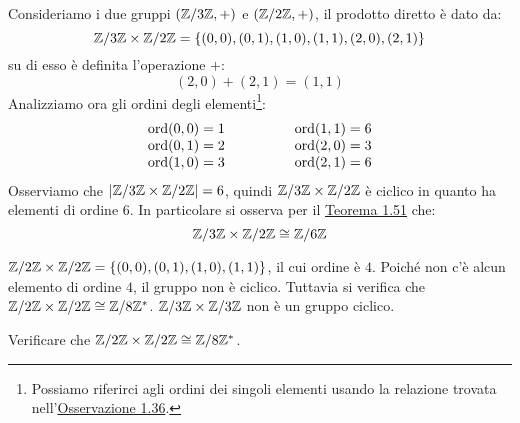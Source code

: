 \documentclass[11pt]{scrartcl}
\begin{document}
\begin{example}
Consideriamo i due gruppi $(\mathbb Z/3\mathbb Z, +)$ e $(\mathbb Z/2\mathbb Z, +)$, il prodotto diretto è dato da:
	\[ \mathbb Z/3\mathbb Z \times \mathbb Z/2\mathbb Z = \left\{(0,0), (0,1), (1,0), (1,1), (2,0), (2,1)\right\}
	\]
su di esso è definita l'operazione $+$:
	\[ (2,0) + (2,1)
	=
	(1, 1)
	\]
Analizziamo ora gli ordini degli elementi\footnote{Possiamo riferirci agli ordini dei singoli elementi usando la relazione trovata nell'\hyperref[g:OrdiniZn]{Osservazione 1.36}.}:
	\[
		\begin{array}{ccc}
		\operatorname{ord}(0,0)=1 \\
		\operatorname{ord}(0,1)=2 \\
		\operatorname{ord}(1,0)=3 \\		
		\end{array}
		\qquad
		\qquad
		\begin{array}{ccc}
		\operatorname{ord}(1,1)=6 \\
		\operatorname{ord}(2,0)=3 \\
		\operatorname{ord}(2,1)=6 \\		
		\end{array}
	\]
Osserviamo che $|\mathbb Z/3\mathbb Z \times \mathbb Z/2\mathbb Z|=6$, quindi $\mathbb Z/3\mathbb Z \times \mathbb Z/2\mathbb Z$ è ciclico in quanto ha elementi di ordine $6$. In particolare si osserva per il \hyperref[g:Iso_ciclici]{Teorema 1.51} che:
	\[ \mathbb Z/3\mathbb Z \times \mathbb Z/2\mathbb Z
	\cong
	\mathbb Z/6\mathbb Z
	\]
\end{example}

\begin{example}
\listhack
\begin{itemize}
	\ii $\mathbb Z/2\mathbb Z \times \mathbb Z/2\mathbb Z = \left\{(0,0), (0,1), (1,0), (1,1)\right\}$, il cui ordine è $4$. Poiché non c'è alcun elemento di ordine $4$, il gruppo non è ciclico. Tuttavia si verifica che $\mathbb Z/2\mathbb Z \times \mathbb Z/2\mathbb Z \cong \mathbb Z/8\mathbb Z^*$.
	\ii $\mathbb Z/3\mathbb Z \times \mathbb Z/3\mathbb Z$ non è un gruppo ciclico.
\end{itemize}
\end{example}

\begin{exercise}
Verificare che $\mathbb Z/2\mathbb Z \times \mathbb Z/2\mathbb Z \cong \mathbb Z/8\mathbb Z^*$.
\end{exercise}
\end{document}
